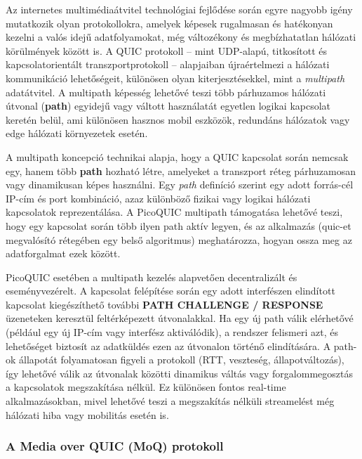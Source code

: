 \documentclass[a4paper,oneside]{article}
\begin{document}
Az internetes multimédiaátvitel technológiai fejlődése során egyre 
nagyobb igény mutatkozik olyan protokollokra, amelyek képesek 
rugalmasan és hatékonyan kezelni a valós idejű adatfolyamokat, még 
változékony és megbízhatatlan hálózati körülmények között is. A QUIC 
protokoll – mint UDP-alapú, titkosított és kapcsolatorientált 
transzportprotokoll – alapjaiban újraértelmezi a hálózati kommunikáció 
lehetőségeit, különösen olyan kiterjesztésekkel, mint a \emph{multipath} 
adatátvitel. A multipath képesség lehetővé teszi több párhuzamos hálózati 
útvonal (\textbf{path}) egyidejű vagy váltott használatát egyetlen logikai kapcsolat keretén 
belül, ami különösen hasznos mobil eszközök, redundáns hálózatok vagy edge 
hálózati környezetek esetén.

A multipath koncepció technikai alapja, hogy a QUIC kapcsolat során nemcsak egy, 
hanem több \textbf{path}
hozható létre, amelyeket a transzport réteg párhuzamosan vagy dinamikusan képes használni. 
Egy \emph{path} definíció szerint egy adott forrás-cél IP-cím és port kombináció, azaz 
különböző fizikai vagy logikai hálózati kapcsolatok reprezentálása. A PicoQUIC multipath 
támogatása lehetővé teszi, hogy egy kapcsolat során több ilyen path aktív legyen, és az 
alkalmazás (quic-et megvalósító rétegében egy belső algoritmus) meghatározza, 
hogyan ossza meg az adatforgalmat ezek között.

PicoQUIC esetében a multipath kezelés alapvetően decentralizált és eseményvezérelt. 
A kapcsolat felépítése során egy adott interfészen elindított kapcsolat kiegészíthető 
további \textbf{PATH CHALLENGE / RESPONSE} üzeneteken keresztül feltérképezett 
útvonalakkal. Ha egy új path válik elérhetővé (például egy új IP-cím vagy interfész 
aktiválódik), a rendszer felismeri azt, és lehetőséget biztosít az adatküldés ezen 
az útvonalon történő elindítására. A path-ok állapotát folyamatosan figyeli a protokoll 
(RTT, veszteség, állapotváltozás), így lehetővé válik az útvonalak közötti dinamikus 
váltás vagy forgalommegosztás a kapcsolatok megszakítása nélkül. Ez különösen 
fontos real-time alkalmazásokban, mivel lehetővé teszi a megszakítás nélküli streamelést 
még hálózati hiba vagy mobilitás esetén is.

\subsubsection{A Media over QUIC (MoQ) protokoll}
\end{document}
